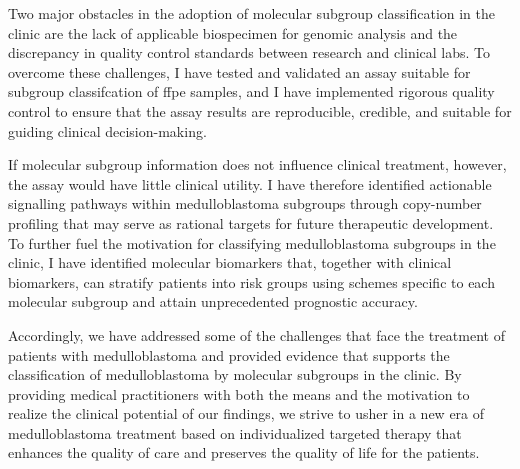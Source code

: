 Two major obstacles in the adoption of molecular subgroup classification in the clinic are the lack of applicable biospecimen for genomic analysis and the discrepancy in quality control standards between research and clinical labs. To overcome these challenges, I have tested and validated an assay suitable for subgroup classifcation of \gls{ffpe} samples, and I have implemented rigorous quality control to ensure that the assay results are reproducible, credible, and suitable for guiding clinical decision-making.

If molecular subgroup information does not influence clinical treatment, however, the assay would have little clinical utility. I have therefore identified actionable signalling pathways within medulloblastoma subgroups through copy-number profiling that may serve as rational targets for future therapeutic development. To further fuel the motivation for classifying medulloblastoma subgroups in the clinic, I have identified molecular biomarkers that, together with clinical biomarkers, can stratify patients into risk groups using schemes specific to each molecular subgroup and attain unprecedented prognostic accuracy.

Accordingly, we have addressed some of the challenges that face the treatment of patients with medulloblastoma and provided evidence that supports the classification of medulloblastoma by molecular subgroups in the clinic. By providing medical practitioners with both the means and the motivation to realize the clinical potential of our findings, we strive to usher in a new era of medulloblastoma treatment based on individualized targeted therapy that enhances the quality of care and preserves the quality of life for the patients.


